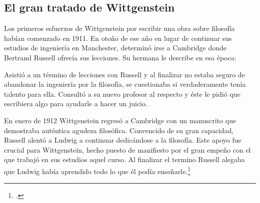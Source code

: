 \subsection{El gran tratado de Wittgenstein}

Los primeros esfuerzos de Wittgenstein por escribir una obra sobre filosofía
habían comenzado en 1911. En otoño de ese año en lugar de continuar sus estudios
de ingeniería en Manchester, determinó irse a Cambridge donde Bertrand Russell
ofrecía sus lecciones. Su hermana le describe en esa época:   

Asistió a un término de lecciones con Russell y al finalizar no estaba seguro de
abandonar la ingeniería por la filosofía, se cuestionaba si verdaderamente tenía
talento para ella. Consultó a su nuevo profesor al respecto y éste le pidió que
escribiera algo para ayudarle a hacer un juicio. 

En enero de 1912 Wittgenstein regresó a Cambridge con un manuscrito que
demostraba auténtica agudeza filosófica. Convencido de su gran capacidad,
Russell alentó a Ludwig a continuar dedicándose a la filosofía. Este
apoyo fue crucial para Wittgenstein, hecho puesto de manifiesto por el gran
empeño con el que trabajó en sus estudios aquel curso. Al finalizar el termino
Russell alegaba que Ludwig había aprendido todo lo que él podía
enseñarle.\footcite[cap. 3 loc 865]{monk} 

